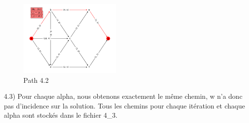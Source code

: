 \documentclass[11pt,A4,french]{article}
\begin{document}
\begin{figure}[ht!]
    \centering
    \includegraphics[max width=0.45\textwidth]{images/path_4_2.png}
    \caption{Path 4.2}
    \label{fig:my_label}
\end{figure}

\par
4.3) 
Pour chaque alpha, nous obtenons exactement le même chemin, w n'a donc pas d'incidence sur la solution.
Tous les chemins pour chaque itération et chaque alpha sont stockés dans le fichier 4\_3.
\end{document}

